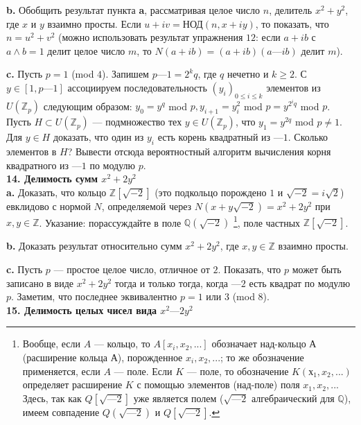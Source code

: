 \textbf{b.} Обобщить результат пункта \textbf{a}, рассматривая целое число $n$, делитель $x^2 + y^2$, где $x$ и $y$ взаимно просты. Если $u+iv = $НОД$(n, x + iy)$, то показать, что $n=u^2+v^2$ (можно использовать результат 
упражнения $12$: если $a + ib$ с $a \wedge b = 1$ делит целое число $m$, то $N(a + ib) = (a + ib)(a — ib)$ делит $m$).

\textbf{c.} Пусть $p = 1$ (mod $4$). Запишем $p—1 = 2^kq$, где $q$ нечетно и $k \ge 2$. С $y \in [1,p—1]$ ассоциируем последовательность $(y_i)_{0\le i\le k}$ элементов из $U(\mathbb{Z}_p)$ следующим образом: $y_0 = y^q$ mod $p, y_{i+1} = y^2_i$ mod $p = y^{2^iq}$ mod $p$. Пусть $H \subset U(\mathbb{Z}_p)$ — подмножество тех $y \in U(\mathbb{Z}_p)$, что $y_1 = y^{2q}$ mod $p \ne
1$. Для $y \in H$ доказать, что один из $y_i$ есть корень квадратный из $—1$.
Сколько элементов в $H$? Вывести отсюда вероятностный алгоритм 
вычисления корня квадратного из $—1$ по модулю $p$.
\\

\noindent \textbf{14. Делимость сумм $x^2+2 y^2$}
\\

\textbf{a.} Доказать, что кольцо $\mathbb{Z}[\sqrt{-2}]$ (это подкольцо порождено $1$ и $\sqrt{-2}=i\sqrt{2}$) евклидово с нормой $N$, определяемой через $N(x+y\sqrt{-2}) = x^2+2y^2$ при $x,y \in \mathbb{Z}$. Указание: порассуждайте в поле $\mathbb{Q}(\sqrt{-2})$ \footnote{Вообще, если $A$ — кольцо, то $A[x_i,x_2,...]$ обозначает над-кольцо $А$ (расширение
кольца $А$), порожденное $x_i,x_2,...$; то же обозначение применяется, если $A$ — поле. Если $K$ — поле, то обозначение $K(х_1,x_2,...)$ определяет расширение $K$ с помощью элементов (над-поле) поля $x_1,x_2,...$ Здесь, так как $Q[\sqrt{—2}]$ уже является полем ($\sqrt{—2}$ алгебраический для $\mathbb{Q}$), имеем совпадение $Q(\sqrt{—2})$ и $Q[\sqrt{— 2}]$.}, поле частных $\mathbb{Z}[\sqrt{-2}]$.

\textbf{b.} Доказать результат относительно сумм $x^2 + 2 y^2$, где $x,y \in \mathbb{Z}$ взаимно просты.

\pagebreak

\textbf{c.} Пусть $p$ — простое целое число, отличное от $2$. Показать, что
$p$ может быть записано в виде $x^2 + 2 y^2$ тогда и только тогда, когда
$—2$ есть квадрат по модулю $p$. Заметим, что последнее эквивалентно
$p = 1$ или $3$ (mod $8$).
\\



\noindent \textbf{15. Делимость целых чисел вида $x^2 — 2 y^2$}
\\


